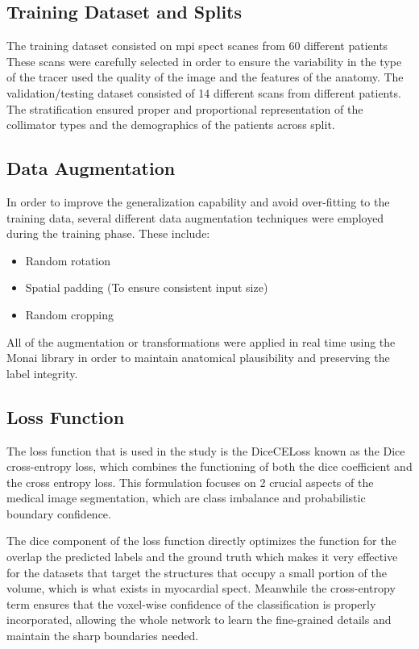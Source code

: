 \subsection{Training Dataset and Splits}
The training dataset consisted on \gls{mpi} \gls{spect} scanes from 60 different patients These scans were carefully selected in order to ensure the variability in the type of the tracer used the quality of the image and the features of the anatomy. The validation/testing dataset consisted of 14 different scans from different patients. The stratification ensured proper and proportional representation of the collimator types and the demographics of the patients across split.

\subsection{Data Augmentation}
In order to improve the generalization capability and avoid over-fitting to the training data, several different data augmentation techniques were employed during the training phase. These include: 
\begin{itemize}
\item Random rotation \item Spatial padding (To ensure consistent input size) \item Random cropping 
\end{itemize}

All of the augmentation or transformations were applied in real time using the Monai library in order to maintain anatomical plausibility and preserving the label integrity.

\subsection{Loss Function}
The loss function that is used in the study is the DiceCELoss known as the Dice cross-entropy loss, which combines the functioning of both the dice coefficient and the cross entropy loss. This formulation focuses on 2 crucial aspects of the medical image segmentation, which are class imbalance and probabilistic boundary confidence.

The dice component of the loss function directly optimizes the function for the overlap the predicted labels and the ground truth which makes it very effective for the datasets that target the structures that occupy a small portion of the volume, which is what exists in myocardial \gls{spect}. Meanwhile the cross-entropy term ensures that the voxel-wise confidence of the classification is properly incorporated, allowing the whole network to learn the fine-grained details and maintain the sharp boundaries needed.

